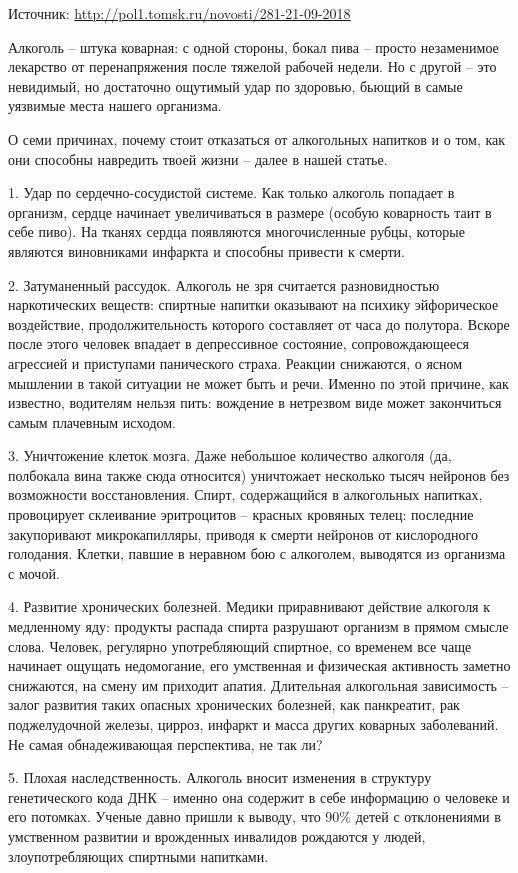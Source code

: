 Источник: \url{http://pol1.tomsk.ru/novosti/281-21-09-2018}

Алкоголь – штука коварная: с одной стороны, бокал пива – просто незаменимое лекарство от перенапряжения после тяжелой рабочей недели. Но с другой – это невидимый, но достаточно ощутимый удар по здоровью, бьющий в самые уязвимые места нашего организма.

О семи причинах, почему стоит отказаться от алкогольных напитков и о том, как они способны навредить твоей жизни – далее в нашей статье.

1. Удар по сердечно-сосудистой системе. Как только алкоголь попадает в организм, сердце начинает увеличиваться в размере (особую коварность таит в себе пиво). На тканях сердца появляются многочисленные рубцы, которые являются виновниками инфаркта и способны привести к смерти.

2. Затуманенный рассудок. Алкоголь не зря считается разновидностью наркотических веществ: спиртные напитки оказывают на психику эйфорическое воздействие, продолжительность которого составляет от часа до полутора. Вскоре после этого человек впадает в депрессивное состояние, сопровождающееся агрессией и приступами панического страха. Реакции снижаются, о ясном мышлении в такой ситуации не может быть и речи. Именно по этой причине, как известно, водителям нельзя пить: вождение в нетрезвом виде может закончиться самым плачевным исходом.

3. Уничтожение клеток мозга. Даже небольшое количество алкоголя (да, полбокала вина также сюда относится) уничтожает несколько тысяч нейронов без возможности восстановления. Спирт, содержащийся в алкогольных напитках, провоцирует склеивание эритроцитов – красных кровяных телец: последние закупоривают микрокапилляры, приводя к смерти нейронов от кислородного голодания. Клетки, павшие в неравном бою с алкоголем, выводятся из организма с мочой.

4. Развитие хронических болезней. Медики приравнивают действие алкоголя к медленному яду: продукты распада спирта разрушают организм в прямом смысле слова. Человек, регулярно употребляющий спиртное, со временем все чаще начинает ощущать недомогание, его умственная и физическая активность заметно снижаются, на смену им приходит апатия. Длительная алкогольная зависимость – залог развития таких опасных хронических болезней, как панкреатит, рак поджелудочной железы, цирроз, инфаркт и масса других коварных заболеваний. Не самая обнадеживающая перспектива, не так ли?

5. Плохая наследственность. Алкоголь вносит изменения в структуру генетического кода ДНК – именно она содержит в себе информацию о человеке и его потомках. Ученые давно пришли к выводу, что 90\% детей с отклонениями в умственном развитии и врожденных инвалидов рождаются у людей, злоупотребляющих спиртными напитками.

